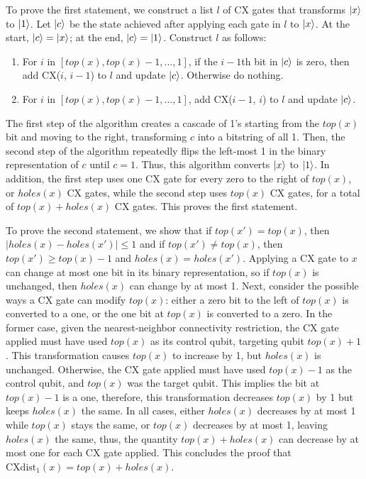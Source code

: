 \documentclass{article}
\begin{document}
To prove the first statement, we construct a list $l$ of CX gates that
transforms $\mathinner{|{x}\rangle}$ to $\mathinner{|{1}\rangle}$. 
Let $\mathinner{|{c}\rangle}$ be the state achieved after applying each gate in $l$ to
$\mathinner{|{x}\rangle}$. At the start, $\mathinner{|{c}\rangle} = \mathinner{|{x}\rangle}$; at the end, $\mathinner{|{c}\rangle} = \mathinner{|{1}\rangle}$.
Construct $l$ as follows:
\begin{enumerate}
    \item For $i$ in $[top(x), top(x) - 1, ..., 1]$, if the $i - 1$th bit in 
	    $\mathinner{|{c}\rangle}$ is
      zero, then add CX($i$, $i - 1$) to $l$ and update $\mathinner{|{c}\rangle}$. Otherwise do
      nothing.
    \item For $i$ in $[top(x), top(x) - 1, ..., 1]$, add CX($i - 1$, $i$) to
      $l$ and update $\mathinner{|{c}\rangle}$.
\end{enumerate}
The first step of the algorithm creates a cascade of 1's starting from the
$top(x)$ bit and moving to the right, transforming $c$ into a bitstring of all
1. Then, the second step of the algorithm repeatedly flips the left-most 1 in
the binary representation of $c$ until $c = 1$. Thus, this algorithm converts
$\mathinner{|{x}\rangle}$ to $\mathinner{|{1}\rangle}$. In addition, the first step uses one CX gate for every
zero to the right of $top(x)$, or $holes(x)$ CX gates, while the second
step uses $top(x)$ CX gates, for a total of $top(x) + holes(x)$ CX gates. This
proves the first statement.

To prove the second statement, we show that if $top(x') = top(x)$, then 
$|holes(x) - holes(x')| \leq 1$ and if $top(x') \neq top(x)$, then 
$top(x') \geq top(x) - 1$ and $holes(x) = holes(x')$.
Applying a CX gate to $x$ can change at most one bit in its binary 
representation, so if $top(x)$ is unchanged, then $holes(x)$ can change by at
most 1. Next, consider the possible ways a CX gate can modify $top(x)$: either
a zero bit to the left of $top(x)$ is converted to a one, or the one bit at
$top(x)$ is converted to a zero. In the former case, given the nearest-neighbor
connectivity restriction, the CX gate applied must have used $top(x)$ as its
control qubit, targeting qubit $top(x) + 1$. This transformation causes $top(x)$
to increase by 1, but $holes(x)$ is unchanged. Otherwise, the CX gate applied
must have used $top(x) - 1$ as the control qubit, and $top(x)$ was the target
qubit. This implies the bit at $top(x) - 1$ is a one, therefore, this
transformation decreases $top(x)$ by 1 but keeps $holes(x)$ the same. In all
cases, either $holes(x)$ decreases by at most 1 while $top(x)$ stays the same,
or $top(x)$ decreases by at most 1, leaving $holes(x)$ the same, thus, the
quantity $top(x) + holes(x)$ can decrease by at most one for each CX gate
applied. This concludes the proof that $\text{CXdist}_1(x) = top(x) + holes(x)$.
\end{document}
